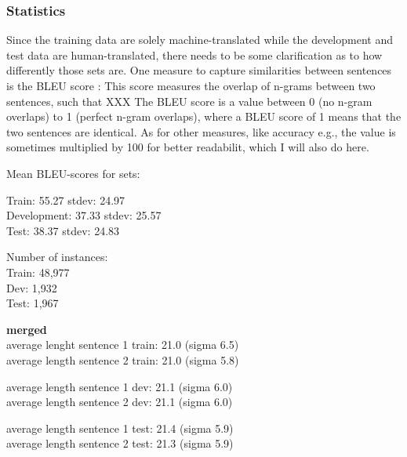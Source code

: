 \subsubsection{Statistics}

Since the training data are solely machine-translated while the development and test data are
human-translated, there needs to be some clarification as to how differently those sets are.
One measure to capture similarities between sentences is the BLEU score \cite{papineni2002bleu}:
This score measures the overlap of n-grams between two sentences, such that XXX
The BLEU score is a value between 0 (no n-gram overlaps) to 1 (perfect n-gram overlaps), where a
BLEU score of 1 means that the two sentences are identical. As for other measures, like accuracy
e.g., the value is sometimes multiplied by 100 for better readabilit, which I will also do here.



Mean BLEU-scores for sets:

Train: 55.27 stdev: 24.97\\
Development: 37.33 stdev: 25.57\\
Test: 38.37 stdev: 24.83




Number of instances: \\
Train: 48,977 \\
Dev: 1,932 \\
Test: 1,967

\textbf{merged} \\
average lenght sentence 1 train: 21.0 (sigma 6.5) \\
average length sentence 2 train: 21.0 (sigma 5.8)

average length sentence 1 dev: 21.1 (sigma 6.0) \\
average length sentence 2 dev: 21.1 (sigma 6.0)

average length sentence 1 test: 21.4 (sigma 5.9) \\
average length sentence 2 test: 21.3 (sigma 5.9)

